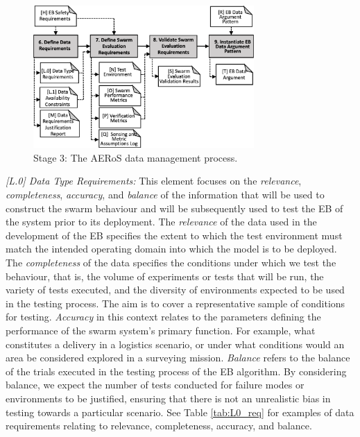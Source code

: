 \documentclass[runningheads]{llncs}
\begin{document}
\begin{figure}[!t]
	\centering
	\includegraphics[width=0.75\textwidth]{figures/AERoS-Stage3.png}%
	\vspace{-2ex}
	\caption{Stage 3: The AERoS data management process.}
	\label{amlas-a-stage3}
	\vspace{-4ex}
\end{figure}

\emph{[L.0] Data Type Requirements:}
This element focuses on the \emph{relevance}, \emph{completeness}, \emph{accuracy}, and \emph{balance} of the information that will be used to construct the swarm behaviour and will be subsequently used to test the EB of the system prior to its deployment. The \emph{relevance} of the data used in the development of the EB specifies the extent to which the test environment must match the intended operating domain into which the model is to be deployed. The \emph{completeness} of the data specifies the conditions under which we test the behaviour, that is, the volume of experiments or tests that will be run, the variety of tests executed, and the diversity of environments expected to be used in the testing process. The aim is to cover a representative sample of conditions for testing. \emph{Accuracy} in this context relates to the parameters defining the performance of the swarm system's primary function. For example, what constitutes a delivery in a logistics scenario, or under what conditions would an area be considered explored in a surveying mission. \emph{Balance} refers to the balance of the trials executed in the testing process of the EB algorithm. By considering balance, we expect the number of tests conducted for failure modes or environments to be justified, ensuring that there is not an unrealistic bias in testing towards a particular scenario. See Table \ref{tab:L0_req} for examples of data requirements relating to relevance, completeness, accuracy, and balance.
\end{document}
